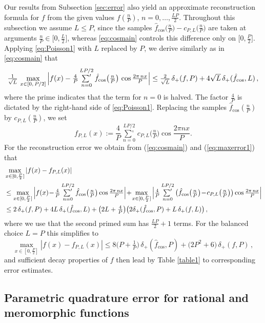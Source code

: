 \documentclass[11pt,a4paper]{scrartcl}
\newcommand{\sumprime}{\mathop{{\sum}'}\limits}
\numberwithin{equation}{section}
\numberwithin{table}{section}
\numberwithin{figure}{section}
\newcommand{\fcos}{{\hat f}_{\cos}}
\newcommand{\dpl}{\delta_{+}}
\begin{document}
Our results from Subsection \ref{sec:error} also yield an approximate reconstruction formula for
$f$ from the given values $f(\tfrac{n}{P})$, $n=0,\ldots,\frac{LP}{2}$. Throughout this subsection
we assume $L \le P$, since the samples $\fcos\big(\tfrac{n}{P}\big) - c_{P,L}\big(\tfrac{n}{P}\big)$
 are taken at arguments $\tfrac{n}{P} \in \big[0,\tfrac L2\big]$, whereas \eqref{eq:cosmain}
controls this difference only on $\big[0,\tfrac P2\big]$. Applying \eqref{eq:Poisson1} with $L$
replaced by $P$, we derive similarly as in \eqref{eq:cosmain} that
\begin{equation}
	\label{eq:maxerror1}
\textstyle 	\frac{1}{\sqrt L}\,\max\limits_{x\in [0,\,P/2]} \Big|f(x) - \frac{4}{P}\sumprime\limits_{n =0}^{LP/2}
	\fcos\big(\tfrac{n}{P}\big)\, \cos \frac{2\pi\,n x}{P}\Big|
	\leq \frac{2}{\sqrt L}\, \dpl(f,P) + 4\sqrt L \, \dpl(\fcos, L)\,,
\end{equation}
where the prime indicates that the term for $n=0$ is halved. The factor $\frac{4}{P}$ is dictated
by the right-hand side of \eqref{eq:Poisson1}. Replacing the samples $\fcos(\tfrac{n}{P})$ by
$c_{P,L}(\tfrac{n}{P})$, we set 
$$ \textstyle f_{P,L}(x) := \frac{4}{P}\sumprime_{n=0}^{LP/2} c_{P,L}\big(\tfrac{n}{P}\big)\cos\frac{2\pi nx}{P}. $$
For the reconstruction error we obtain from (\ref{eq:cosmain}) and (\ref{eq:maxerror1})
that
\begin{align}
\label{eq:reconchain}
\textstyle 	& \max\limits_{x\in [0, \frac{P}{2}]}  | f(x) - f_{P,L}(x)| \nonumber \\
&\leq  \textstyle
	\max\limits_{x\in [0,\frac{P}{2}]} \Big|f(x) \!-\! \tfrac{4}{P}\sumprime\limits_{n =0}^{LP/2} \fcos\big(\tfrac{n}{P}\big)
	 \cos \frac{2\pi\,n x}{P}  \Big|
	 \!+\! \max\limits_{x\in [0,\frac{P}{2}]}  \Big|\tfrac{4}{P}\sumprime\limits_{n =0}^{LP/2}
	\big( \fcos\big(\tfrac{n}{P}\big)\! -\!c_{P,L}\big(\tfrac{n}{P}\big)\big)
	\cos \frac{2\pi\,n x}{P}
	\Big| \nonumber\\
&\leq \textstyle  2\, \dpl(f,P) + 4 L \, \dpl(\fcos, L)  + \big(2L + \tfrac{4}{P}\big)
\big( 2 \dpl(\fcos,P) + L\, \dpl(f,L) \big)\,,
\end{align}
where we use that the second primed sum has  $\frac{LP}{2}+1$ terms. For the balanced
choice $L=P$ this simplifies to
$$
\textstyle \max\limits_{x\in [0, \frac{P}{2}]}  | f(x) - f_{P,L}(x)|
\le 8 \big(P + \tfrac1P\big)\,\dpl(\fcos,P) + \big(2P^2+6\big)\,\dpl(f,P)\,,
$$
and  sufficient decay properties of $f$ then lead by Table \ref{table1} to corresponding error estimates.

\subsection{Parametric quadrature error for rational and meromorphic functions}
\label{sec:sharpFT}
\end{document}
